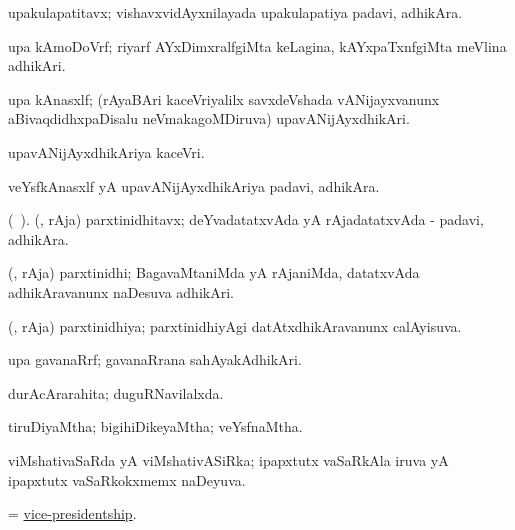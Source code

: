 \bentry
{} 
\gl{\nA}
\expl{}
\bmng
 upakulapatitavx; vishavxvidAyxnilayada upakulapatiya padavi, adhikAra. 
\emng
\eentry

\bentry
{} 
\gl{\nA}
\expl{}
\bmng
 upa kAmoDoVrf; riyarf AYxDimxralfgiMta keLagina, kAYxpaTxnfgiMta meVlina adhikAri. 
\emng
\eentry

\bentry
{} 
\gl{\nA}
\expl{}
\bmng
 upa kAnasxlf; (rAyaBAri kaceVriyalilx savxdeVshada vANijayxvanunx aBivaqdidhxpaDisalu neVmakagoMDiruva) upavANijAyxdhikAri. 
\emng
\eentry

\bentry
{} 
\gl{\nA}
\expl{}
\bmng
 upavANijAyxdhikAriya kaceVri. 
\emng
\eentry

\bentry
{} 
\gl{\nA}
\expl{}
\bmng
 veYsfkAnasxlf yA upavANijAyxdhikAriya padavi, adhikAra. 
\emng
\eentry

\bentry
{} 
\gl{\nA}(\bava\ ). 
\bmng
 (\deVva, rAja) parxtinidhitavx; deYvadatatxvAda yA rAjadatatxvAda - padavi, adhikAra. 
\emng
\eentry

\bentry
{} 
\gl{\nA}
\expl{}
\bmng
 (\deVva, rAja) parxtinidhi; BagavaMtaniMda yA rAjaniMda, datatxvAda adhikAravanunx naDesuva adhikAri. 
\emng
\eentry

\bentry
{} 
\gl{\gu}
\expl{}
\bmng
 (\deVva, rAja) parxtinidhiya; parxtinidhiyAgi datAtxdhikAravanunx calAyisuva. 
\emng
\eentry

\bentry
{} 
\gl{\nA}
\expl{}
\bmng
 upa gavanaRrf; gavanaRrana sahAyakAdhikAri. 
\emng
\eentry

\bentry
{} 
\gl{\gu}
\expl{}
\bmng
 durAcArarahita; duguRNavilalxda. 
\emng
\eentry

\bentry
{} 
\gl{\gu}
\expl{}
\bmng
 tiruDiyaMtha; bigihiDikeyaMtha; veYsfnaMtha. 
\emng
\eentry

\bentry
{} 
\gl{\gu}
\expl{}
\bmng
 viMshativaSaRda yA viMshativASiRka; ipapxtutx vaSaRkAla iruva yA ipapxtutx vaSaRkokxmemx naDeyuva. 
\emng
\eentry

\bentry
{} 
\gl{\nA}
\expl{}
\bmng
 = \hyperlink{vice-presidentship}{vice-presidentship}. 
\emng
\eentry


